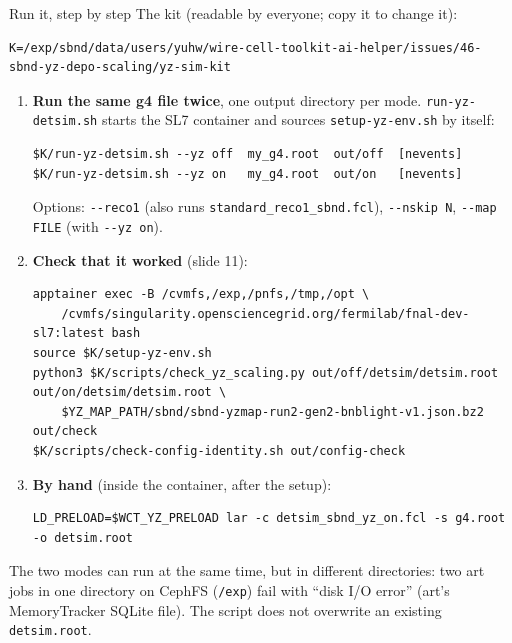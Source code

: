 \documentclass[aspectratio=169,10pt]{beamer}
\newcommand{\code}[1]{\texttt{#1}}
\begin{document}
\begin{frame}[fragile]{Run it, step by step}
\footnotesize
The kit (readable by everyone; copy it to change it):
\begin{lstlisting}
K=/exp/sbnd/data/users/yuhw/wire-cell-toolkit-ai-helper/issues/46-sbnd-yz-depo-scaling/yz-sim-kit
\end{lstlisting}
\begin{enumerate}
\item \textbf{Run the same g4 file twice}, one output directory per mode. \code{run-yz-detsim.sh} starts the SL7 container and sources \code{setup-yz-env.sh} by itself:
\begin{lstlisting}
$K/run-yz-detsim.sh --yz off  my_g4.root  out/off  [nevents]
$K/run-yz-detsim.sh --yz on   my_g4.root  out/on   [nevents]
\end{lstlisting}
Options: \code{-{}-reco1} (also runs \code{standard\_reco1\_sbnd.fcl}), \code{-{}-nskip N}, \code{-{}-map FILE} (with \code{-{}-yz on}).
\item \textbf{Check that it worked} (slide 11):
\begin{lstlisting}
apptainer exec -B /cvmfs,/exp,/pnfs,/tmp,/opt \
    /cvmfs/singularity.opensciencegrid.org/fermilab/fnal-dev-sl7:latest bash
source $K/setup-yz-env.sh
python3 $K/scripts/check_yz_scaling.py out/off/detsim/detsim.root out/on/detsim/detsim.root \
    $YZ_MAP_PATH/sbnd/sbnd-yzmap-run2-gen2-bnblight-v1.json.bz2 out/check
$K/scripts/check-config-identity.sh out/config-check
\end{lstlisting}
\item \textbf{By hand} (inside the container, after the setup):
\begin{lstlisting}
LD_PRELOAD=$WCT_YZ_PRELOAD lar -c detsim_sbnd_yz_on.fcl -s g4.root -o detsim.root
\end{lstlisting}
\end{enumerate}
\vspace{1mm}
The two modes can run at the same time, but in different directories: two art jobs in one directory on CephFS (\code{/exp}) fail with ``disk I/O error'' (art's MemoryTracker SQLite file). The script does not overwrite an existing \code{detsim.root}.
\end{frame}
\end{document}
